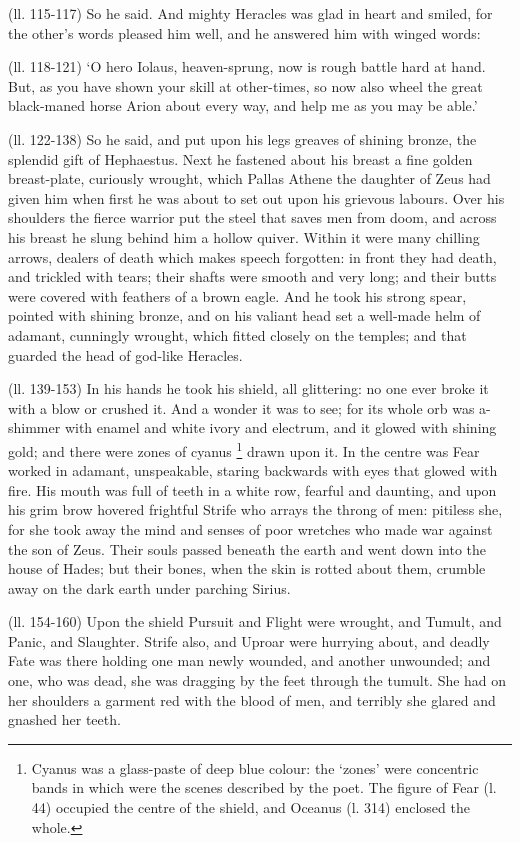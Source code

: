 (ll. 115-117) So he said. And mighty Heracles was glad in heart and smiled, for
the other’s words pleased him well, and he answered him with winged
words:

(ll. 118-121) ‘O hero Iolaus, heaven-sprung, now is rough battle hard at
hand. But, as you have shown your skill at other-times, so now also wheel the
great black-maned horse Arion about every way, and help me as you may be
able.’

(ll. 122-138) So he said, and put upon his legs greaves of shining bronze, the
splendid gift of Hephaestus. Next he fastened about his breast a fine golden
breast-plate, curiously wrought, which Pallas Athene the daughter of Zeus had
given him when first he was about to set out upon his grievous labours. Over
his shoulders the fierce warrior put the steel that saves men from doom, and
across his breast he slung behind him a hollow quiver. Within it were many
chilling arrows, dealers of death which makes speech forgotten: in front they
had death, and trickled with tears; their shafts were smooth and very long; and
their butts were covered with feathers of a brown eagle. And he took his strong
spear, pointed with shining bronze, and on his valiant head set a well-made
helm of adamant, cunningly wrought, which fitted closely on the temples; and
that guarded the head of god-like Heracles.

(ll. 139-153) In his hands he took his shield, all glittering: no one ever
broke it with a blow or crushed it. And a wonder it was to see; for its whole
orb was a-shimmer with enamel and white ivory and electrum, and it glowed with
shining gold; and there were zones of cyanus \footnote{Cyanus was a glass-paste
of deep blue colour: the ‘zones’ were concentric bands in which
were the scenes described by the poet. The figure of Fear (l. 44) occupied the
centre of the shield, and Oceanus (l. 314) enclosed the whole.} drawn
upon it. In the centre was Fear worked in adamant, unspeakable, staring
backwards with eyes that glowed with fire. His mouth was full of teeth in a
white row, fearful and daunting, and upon his grim brow hovered frightful
Strife who arrays the throng of men: pitiless she, for she took away the mind
and senses of poor wretches who made war against the son of Zeus. Their souls
passed beneath the earth and went down into the house of Hades; but their
bones, when the skin is rotted about them, crumble away on the dark earth under
parching Sirius.

(ll. 154-160) Upon the shield Pursuit and Flight were wrought, and Tumult, and
Panic, and Slaughter. Strife also, and Uproar were hurrying about, and deadly
Fate was there holding one man newly wounded, and another unwounded; and one,
who was dead, she was dragging by the feet through the tumult. She had on her
shoulders a garment red with the blood of men, and terribly she glared and
gnashed her teeth.


